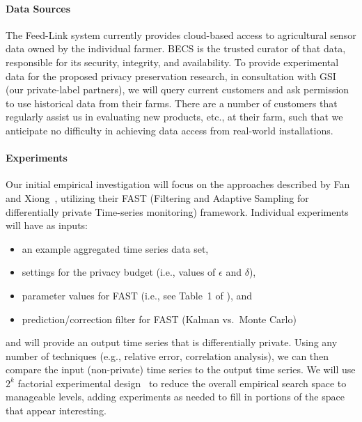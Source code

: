 \paragraph{Data Sources}
The Feed-Link system currently provides cloud-based access to
agricultural sensor data owned by the individual farmer.
BECS is the trusted curator of that data, responsible for its security,
integrity, and availability.  To provide experimental
data for the proposed privacy preservation research, in
consultation with GSI (our private-label partners), we will query 
current customers and ask permission to use historical data from their
farms.  There are a number of customers that regularly assist
us in evaluating new products, etc., at their farm, such that we anticipate
no difficulty in achieving data access from real-world installations.


\paragraph{Experiments}
Our initial empirical investigation will focus on the approaches
described by Fan and Xiong~\cite{fx12,fx14}, utilizing their
FAST (Filtering and Adaptive Sampling for differentially private
Time-series monitoring) framework. Individual experiments will have
as inputs:
\begin{itemize}
\item an example aggregated time series data set,
\item settings for the privacy budget
(i.e., values of $\epsilon$ and $\delta$),
\item parameter values for FAST (i.e., see Table~1 of \cite{fx14}), and
\item prediction/correction filter for FAST (Kalman vs.~Monte Carlo)
\end{itemize}
and will provide an output time series that is differentially private.
Using any number of techniques (e.g., relative error, correlation analysis), 
we can then compare the input (non-private) time series to the output
time series.
We will use $2^k$ factorial experimental design~\cite{Jain91}
to reduce the overall empirical search space to manageable levels,
adding experiments as needed to fill in portions of the space that
appear interesting.


